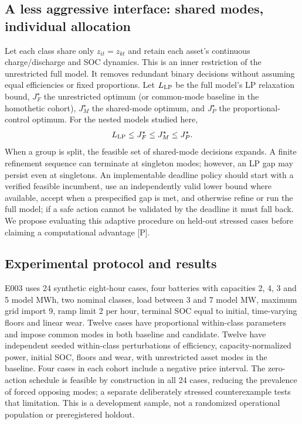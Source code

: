 \documentclass[11pt,letterpaper]{article}
\begin{document}
\subsection{A less aggressive interface: shared modes, individual allocation}
Let each class share only $z_{it}=z_{kt}$ and retain each asset's continuous charge/discharge and SOC dynamics. This is an inner restriction of the unrestricted full model. It removes redundant binary decisions without assuming equal efficiencies or fixed proportions. Let $L_{\rm LP}$ be the full model's LP relaxation bound, $J_F^\star$ the unrestricted optimum (or common-mode baseline in the homothetic cohort), $J_M^\star$ the shared-mode optimum, and $J_P^\star$ the proportional-control optimum. For the nested models studied here,
\[
L_{\rm LP}\le J_F^\star\le J_M^\star\le J_P^\star.
\]
When a group is split, the feasible set of shared-mode decisions expands. A finite refinement sequence can terminate at singleton modes; however, an LP gap may persist even at singletons. An implementable deadline policy should start with a verified feasible incumbent, use an independently valid lower bound where available, accept when a prespecified gap is met, and otherwise refine or run the full model; if a safe action cannot be validated by the deadline it must fall back. We propose evaluating this adaptive procedure on held-out stressed cases before claiming a computational advantage [P].

\subsection{Experimental protocol and results}
E003 uses 24 synthetic eight-hour cases, four batteries with capacities 2, 4, 3 and 5 model MWh, two nominal classes, load between 3 and 7 model MW, maximum grid import 9, ramp limit 2 per hour, terminal SOC equal to initial, time-varying floors and linear wear. Twelve cases have proportional within-class parameters and impose common modes in both baseline and candidate. Twelve have independent seeded within-class perturbations of efficiency, capacity-normalized power, initial SOC, floors and wear, with unrestricted asset modes in the baseline. Four cases in each cohort include a negative price interval. The zero-action schedule is feasible by construction in all 24 cases, reducing the prevalence of forced opposing modes; a separate deliberately stressed counterexample tests that limitation. This is a development sample, not a randomized operational population or preregistered holdout.
\end{document}
